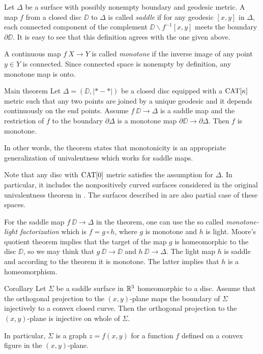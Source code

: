 \documentclass{article}
\begin{document}
Let $\Delta$ be a surface with possibly nonempty boundary and geodesic metric.
A map $f$ from a closed disc $\DD$ to $\Delta$ is called \emph{saddle} 
if for any geodesic $[x,y]$ in $\Delta$, each connected component of the complement $\DD\backslash f^{-1}[x,y]$ meets the boundary $\partial\DD$.
It is easy to see that this definition agrees with the one given above.

A continuous map $f\:X\to Y$ is called \emph{monotone} if the inverse image of any point $y\in Y$ is connected.
Since connected space is nonempty by definition, any monotone map is onto.

\begin{thm}{Main theorem}\label{thm:main}
Let $\Delta=(\DD,|{*}-{*}|)$ be a closed disc equipped with a $\mathop{\rm CAT}\nolimits[\kappa]$ metric 
such that any two points are joined by a unique geodesic and it depends continuously on the end points.
Assume $f\:\DD\to \Delta$ is a saddle map and the restriction of $f$ to the boundary $\partial\Delta$ is a monotone map 
$\partial\DD\to  \partial\Delta$.
Then $f$ is monotone. 
\end{thm}

In other words, the theorem states that monotonicity is an appropriate generalization of univalentness which works for saddle maps.

 Note that any disc with $\mathop{\rm CAT}\nolimits[0]$ metric satisfies the assumption for $\Delta$.
In particular, it includes the nonpositively curved surfaces considered in the original univalentness theorem in \cite{schoen-yau}.
The surfaces described in \cite{jost} are also partial case of these spaces.

For the saddle map $f\:\DD\to \Delta$ in the theorem,
one can use the so called \emph{monotone-light factorization} %
which is $f=g\circ h$,
where $g$ is monotone and $h$ is light.
Moore's quotient theorem \cite{moore} implies that the target of the map $g$ is homeomorphic to the disc $\DD$, so we may think that $g\:\DD\to \DD$ and $h\:\DD\to \Delta$.
The light map $h$ is saddle and according to the theorem it is monotone.
The latter implies that $h$ is a homeomorphism.




\begin{thm}{Corollary}
Let $\Sigma$ be a saddle surface in $\mathbb{R}^3$ homeomorphic to a disc.
Assume that the orthogonal projection to the $(x,y)$-plane
maps the boundary of $\Sigma$
injectively to a convex closed curve.
Then the orthogonal projection to the $(x,y)$-plane is injective on whole of $\Sigma$.

In particular, $\Sigma$ is a graph $z=f(x,y)$ for a function $f$ defined on a convex figure in the $(x,y)$-plane.
\end{thm}
\end{document}
